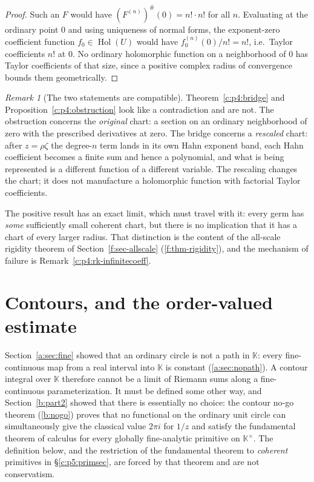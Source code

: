 \documentclass[11pt,a4paper]{article}
\numberwithin{equation}{section}
\theoremstyle{definition}
\theoremstyle{remark}
\newtheorem{remark}[theorem]{Remark}
\theoremstyle{plain}
\newcommand{\K}{\mathbb K}
\DeclareMathOperator{\Hol}{Hol}
\newcommand{\ev}[1]{#1^{\#}}
\begin{document}
\begin{proof}
Such an $F$ would have $\ev{(F^{(n)})}(0)=n!\cdot n!$ for all $n$.
Evaluating at the ordinary point $0$ and using uniqueness of normal
forms, the exponent-zero coefficient function $f_0\in\Hol(U)$ would have
$f_0^{(n)}(0)/n!=n!$, i.e.\ Taylor coefficients $n!$ at $0$. No ordinary
holomorphic function on a neighborhood of $0$ has Taylor coefficients of
that size, since a positive complex radius of convergence bounds them
geometrically.
\end{proof}

\begin{remark}[The two statements are compatible]
\label{c:p4:rk-reconcile}
Theorem~\ref{c:p4:bridge} and Proposition~\ref{c:p4:obstruction} look
like a contradiction and are not. The obstruction concerns the
\emph{original} chart: a section on an ordinary neighborhood of zero with
the prescribed derivatives at zero. The bridge concerns a
\emph{rescaled} chart: after $z=\rho\zeta$ the degree-$n$ term lands in
its own Hahn exponent band, each Hahn coefficient becomes a finite sum
and hence a polynomial, and what is being represented is a different
function of a different variable. The rescaling changes the chart; it
does not manufacture a holomorphic function with factorial Taylor
coefficients.

The positive result has an exact limit, which must travel with it:
every germ has \emph{some} sufficiently small coherent chart, but there
is no implication that it has a chart of every larger radius. That
distinction is the content of the all-scale rigidity theorem of
Section~\ref{f:sec-allscale} (\ref{f:thm-rigidity}), and the mechanism of failure is
Remark~\ref{c:p4:rk-infinitecoeff}.
\end{remark}


\section{Contours, and the order-valued estimate}
\label{c:p5}

Section~\ref{a:sec:fine} showed that an ordinary circle is not a path in $\K$:
every fine-continuous map from a real interval into $\K$ is constant
(\ref{a:sec:nopath}). A contour integral over $\K$ therefore cannot be a
limit of Riemann sums along a fine-continuous parameterization. It must
be defined some other way, and Section~\ref{b:part2} showed that there is
essentially no choice: the contour no-go theorem (\ref{b:nogo})
proves that no functional on the ordinary unit circle can simultaneously
give the classical value $2\pi i$ for $1/z$ and satisfy the fundamental
theorem of calculus for every globally fine-analytic primitive on
$\K^{\times}$. The definition below, and the restriction of the
fundamental theorem to \emph{coherent} primitives in
\S\ref{c:p5:primsec}, are forced by that theorem and are not
conservatism.
\end{document}

